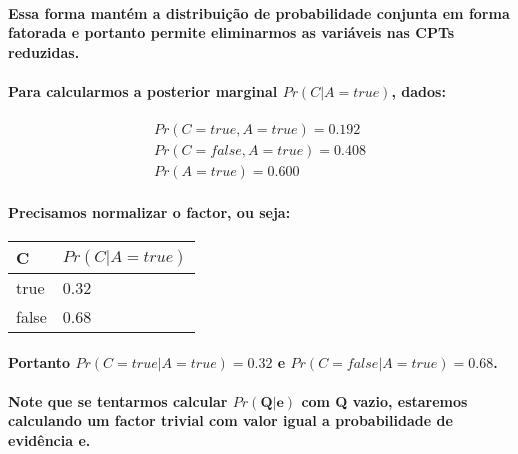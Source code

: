 \documentclass[a4paper,10pt]{article}
\theoremstyle{plain}
\begin{document}
\paragraph{
  Essa forma mantém a distribuição de probabilidade conjunta em forma fatorada e portanto permite
  eliminarmos as variáveis nas CPTs reduzidas.
}

\paragraph{
  Para calcularmos a posterior marginal $Pr(C|A=true)$, dados:
}

\begin{equation}
  \begin{split}
    Pr(C=true, A=true) = 0.192 \\
    Pr(C=false, A=true) = 0.408 \\
    Pr(A=true) = 0.600
  \end{split}
\end{equation}

\paragraph{
  Precisamos normalizar o factor, ou seja:
}

\begin{table}[h]
  \begin{center}
    \begin{tabular}{l | l}
      C & $Pr(C|A=true)$ \\
      \hline
      true & 0.32 \\
      false & 0.68 \\
    \end{tabular}
  \end{center}
\end{table}

\paragraph{
  Portanto $Pr(C=true|A=true) = 0.32$ e $Pr(C=false|A=true) = 0.68$.
}

\paragraph{
  Note que se tentarmos calcular $Pr(\textbf{Q}|\textbf{e})$ com \textbf{Q} vazio, estaremos
  calculando um factor trivial com valor igual a probabilidade de evidência \textbf{e}.
}
\end{document}
